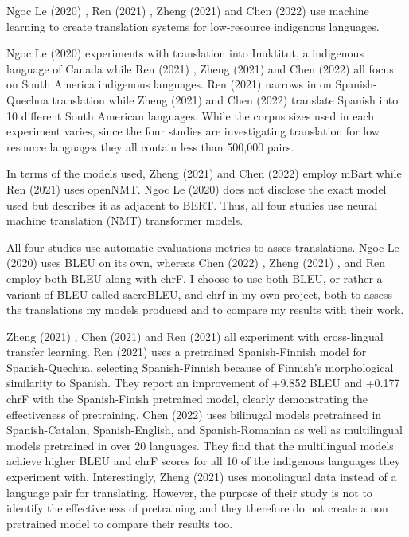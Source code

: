 \documentclass[10pt,twocolumn]{article}
\begin{document}
Ngoc Le (2020) \cite{NgocLe} , Ren (2021) \cite{Ren},  Zheng (2021) \cite{Zheng} and Chen (2022) \cite {Chen} use machine learning to create translation systems for low-resource indigenous languages.

Ngoc Le (2020) \cite{NgocLe} experiments with translation into Inuktitut, a indigenous language of Canada while Ren (2021) \cite{Ren}, Zheng (2021) \cite{Zheng} and Chen (2022) \cite {Chen}  all focus on South America indigenous languages. Ren (2021) \cite{Ren} narrows in on Spanish-Quechua translation while Zheng (2021) and Chen (2022) translate Spanish into 10 different South American languages. While the corpus sizes used in each experiment varies, since the four studies are investigating translation for low resource languages they all contain less than 500,000 pairs.

In terms of the models used, Zheng (2021) \cite{Zheng} and Chen (2022) \cite {Chen} employ mBart while Ren (2021) \cite{Ren} uses openNMT. Ngoc Le (2020) \cite{NgocLe} does not disclose the exact model used but describes it as adjacent to BERT. Thus, all four studies use neural machine translation (NMT) transformer models.

All four studies use automatic evaluations metrics to asses translations. Ngoc Le (2020) \cite{NgocLe} uses BLEU on its own, whereas Chen (2022) \cite {Chen} , Zheng (2021) \cite{Zheng}, and Ren \cite{REN} employ both BLEU along with chrF. I choose to use both BLEU, or rather a variant of BLEU called sacreBLEU, and chrf  in my own project, both to assess the translations my models produced and to compare my results with their work. 

Zheng (2021) \cite{Zheng}, Chen (2021) \cite {Chen}  and Ren (2021) \cite{Ren} all experiment with cross-lingual transfer learning. Ren (2021) \cite{Ren} uses a pretrained Spanish-Finnish model for Spanish-Quechua, selecting Spanish-Finnish because of Finnish's morphological similarity to Spanish. They report an improvement of +9.852 BLEU and +0.177 chrF with the Spanish-Finish pretrained model, clearly demonstrating the effectiveness of pretraining. Chen (2022) \cite {Chen} uses bilinugal models pretraineed in Spanish-Catalan, Spanish-English, and Spanish-Romanian as well as multilingual models pretrained in over 20 languages. They find that the multilingual models achieve higher BLEU and chrF scores for all 10 of the indigenous languages they experiment with. Interestingly, Zheng (2021) \cite{Zheng} uses monolingual data instead of a language pair for translating. However, the purpose of their study is not to identify the effectiveness of pretraining and they therefore do not create a non pretrained model to compare their results too.
\end{document}

